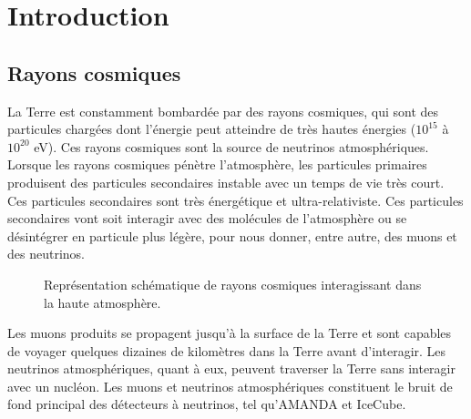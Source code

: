 \section{Introduction}

\subsection{Rayons cosmiques}
La Terre est constamment bombardée par des rayons cosmiques, qui sont des particules chargées dont l'énergie peut atteindre de très hautes énergies ($10^{15}$ à $10^{20}$ eV). Ces rayons cosmiques sont la source de neutrinos atmosphériques. Lorsque les rayons cosmiques pénètre l'atmosphère, les particules primaires produisent des particules secondaires instable avec un temps de vie très court. Ces particules secondaires sont très énergétique et ultra-relativiste. Ces particules secondaires vont soit interagir avec des molécules de l'atmosphère ou se désintégrer en particule plus légère, pour nous donner, entre autre, des muons et des neutrinos.\\

\begin{figure}[h!]
    \caption{\label{fig:CR} Représentation schématique de rayons cosmiques interagissant dans la haute atmosphère.}
\end{figure}

Les muons produits se propagent jusqu'à la surface de la Terre et sont capables de voyager quelques dizaines de kilomètres dans la Terre avant d'interagir. Les neutrinos atmosphériques, quant à eux, peuvent traverser la Terre sans interagir avec un nucléon. Les muons et neutrinos atmosphériques constituent le bruit de fond principal des détecteurs à neutrinos, tel qu'AMANDA et IceCube.

